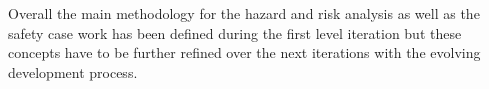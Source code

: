 \documentclass{template/openetcs_report}
\begin{document}
Overall the main methodology for the hazard and risk analysis as well as the safety case work has been defined during the first level iteration but these concepts have to be further refined over the next iterations with the evolving development process.





\end{document}
